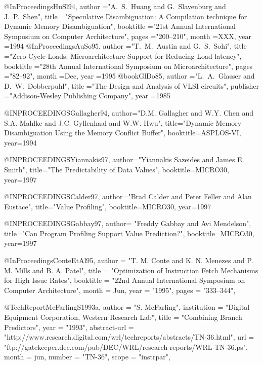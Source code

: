 @InProceedings{HuSl94,
        author          ="A.~S.~Huang and G.~Slavenburg and J.~P.~Shen",
        title           ="Speculative Disambiguation: A Compilation
                          technique for Dynamic Memory Disambiguation",
        booktitle       ="21st Annual International Symposium on
                          Computer Architecture",
        pages           ="200--210",
        month           =XXX,
        year            =1994
}
@InProceedings{AuSo95,
        author          ="T.~M.~Austin and G.~S.~Sohi",
        title           ="Zero-Cycle Loads: Microarchitecture Support for
                          Reducing Load latency",
        booktitle       ="28th Annual International Symposium on
                          Microarchitecture",
        pages           ="82--92",
        month           =Dec,
        year            =1995
}
@book{GlDo85,
        author          ="L.~A.~Glasser and D.~W.~Dobberpuhl",
        title           ="The Design and Analysis of VLSI circuits",
        publisher       ="Addison-Wesley Publishing Company",
        year            =1985
}


@INPROCEEDINGS{Gallagher94,
  author="D.M. Gallagher and W.Y. Chen and S.A. Mahlke and
                  J.C. Gyllenhaal and W.W. Hwu",
  title="Dynamic Memory Disambiguation Using the Memory Conflict Buffer",
  booktitle=ASPLOS-VI,
  year=1994
}


@INPROCEEDINGS{Yiannakis97,
  author="Yiannakis Sazeides and James E. Smith",
  title="The Predictability of Data Values",
  booktitle=MICRO30,
  year=1997
}

@INPROCEEDINGS{Calder97,
  author="Brad Calder and Peter Feller and Alan Eustace",
  title="Value Profiling",
  booktitle=MICRO30,
  year=1997
}


@INPROCEEDINGS{Gabbay97,
  author= "Freddy Gabbay and Avi Mendelson",
  title="Can Program Profiling Support Value Prediction?",
  booktitle=MICRO30,
  year=1997
}


@InProceedings{ConteEtAl95,
  author =       "T. M. Conte and K. N. Menezes and P. M. Mills and B. A. Patel",
  title =        "Optimization of Instruction Fetch Mechanisms for High
                 Issue Rates",
  booktitle =    "22nd Annual International Symposium on Computer Architecture",
  month =        Jun,
  year =         "1995",
  pages =        "333--344",
}

@TechReport{McFarlingS1993a,
  author =       "S. McFarling",
  institution =  "Digital Equipment Corporation, Western Research Lab",
  title =        "Combining Branch Predictors",
  year =         "1993",
  abstract-url = "http://www.research.digital.com/wrl/techreports/abstracts/TN-36.html",
  url =          "ftp://gatekeeper.dec.com/pub/DEC/WRL/research-reports/WRL-TN-36.ps",
  month =        jun,
  number =       "TN-36",
  scope =        "instrpar",
}



